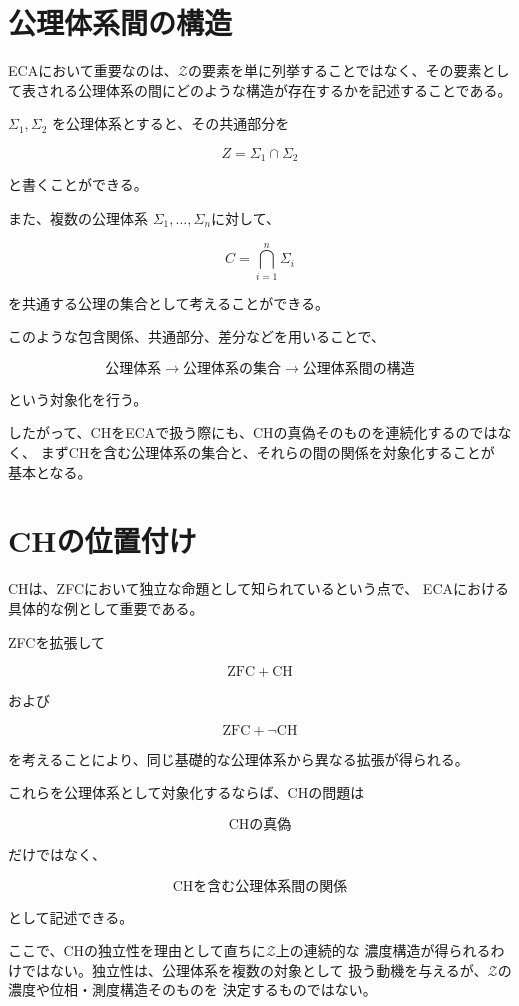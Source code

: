 \documentclass[12pt,a4paper]{article}
\begin{document}
\section{公理体系間の構造}

ECAにおいて重要なのは、$\mathcal{Z}$の要素を単に列挙することではなく、その要素として表される公理体系の間にどのような構造が存在するかを記述することである。

$\Sigma_1,\Sigma_2$ を公理体系とすると、その共通部分を

\[
Z=\Sigma_1\cap\Sigma_2
\]

と書くことができる。

また、複数の公理体系
$\Sigma_1,\ldots,\Sigma_n$に対して、

\[
C=\bigcap_{i=1}^{n}\Sigma_i
\]

を共通する公理の集合として考えることができる。

このような包含関係、共通部分、差分などを用いることで、

\[
\text{公理体系}
\longrightarrow
\text{公理体系の集合}
\longrightarrow
\text{公理体系間の構造}
\]

という対象化を行う。

したがって、CHをECAで扱う際にも、CHの真偽そのものを連続化するのではなく、
まずCHを含む公理体系の集合と、それらの間の関係を対象化することが
基本となる。

\section{CHの位置付け}

CHは、ZFCにおいて独立な命題として知られているという点で、
ECAにおける具体的な例として重要である。

ZFCを拡張して

\[
\mathrm{ZFC}+\mathrm{CH}
\]

および

\[
\mathrm{ZFC}+\neg\mathrm{CH}
\]

を考えることにより、同じ基礎的な公理体系から異なる拡張が得られる。

これらを公理体系として対象化するならば、CHの問題は

\[
\text{CHの真偽}
\]

だけではなく、

\[
\text{CHを含む公理体系間の関係}
\]

として記述できる。

ここで、CHの独立性を理由として直ちに$\mathcal{Z}$上の連続的な
濃度構造が得られるわけではない。独立性は、公理体系を複数の対象として
扱う動機を与えるが、$\mathcal{Z}$の濃度や位相・測度構造そのものを
決定するものではない。
\end{document}
